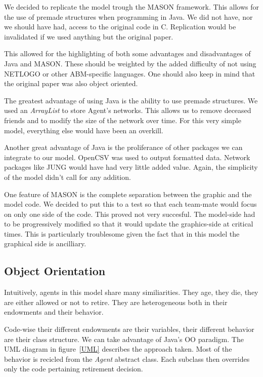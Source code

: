 \documentclass[runningheads,a4paper]{llncs}
\begin{document}
We decided to replicate the model trough the MASON framework.
This allows for the use of premade structures when programming in Java.
We did not have, nor we should have had, access to the original code in C.
Replication would be invalidated if we used anything but the original paper.

This allowed for the highlighting of both some advantages and disadvantages of Java and MASON.
These should be weighted by the added difficulty of not using NETLOGO or other ABM-specific languages.
One should also keep in mind that the original paper was also object oriented.

The greatest advantage of using Java is the ability to use premade structures.
We used an \textit{ArrayList} to store Agent's networks.
This allows us to remove deceased friends and to modify the size of the network over time.
For this very simple model, everything else would have been an overkill.

Another great advantage of Java is the proliferance of other packages we can integrate to our model.
OpenCSV was used to output formatted data.
Network packages like JUNG would have had very little added value.
Again, the simplicity of the model didn't call for any addition.

One feature of MASON is the complete separation between the graphic and the model code.
We decided to put this to a test so that each team-mate would focus on only one side of the code.
This proved not very succesful.
The model-side had to be progressively modified so that it would update the graphics-side at critical times.
This is particularly troublesome given the fact that in this model the graphical side is ancilliary.

\subsection{Object Orientation}

Intuitively, agents in this model share many similiarities.
They age, they die, they are either allowed or not to retire.
They are heterogeneous both in their endowments and their behavior.

Code-wise their different endowments are their variables, their different behavior are their class structure.
We can take advantage of Java's OO paradigm.
The UML diagram in figure~\ref{UML} describes the approach taken.
Most of the behavior is recicled from the \textit{Agent} abstract class.
Each subclass then overrides only the code pertaining retirement decision.
\end{document}
